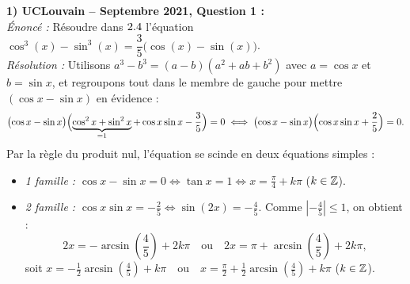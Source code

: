 \begin{exemple}
\textbf{1) UCLouvain -- Septembre 2021, Question 1 :}\\
\emph{Énoncé :} Résoudre dans $2.4$ l'équation $\cos^3(x) - \sin^3(x) = \dfrac{3}{5}\bigl(\cos(x) - \sin(x)\bigr)$.\\
\emph{Résolution :} Utilisons $a^3 - b^3 = (a-b)(a^2 + ab + b^2)$ avec $a = \cos x$ et $b = \sin x$, et regroupons tout dans le membre de gauche pour mettre $(\cos x - \sin x)$ en évidence :
\[
    \bigl(\cos x - \sin x\bigr)\Bigl(\underbrace{\cos^2 x + \sin^2 x}_{=1} + \cos x \sin x - \frac{3}{5}\Bigr) = 0 \iff \bigl(\cos x - \sin x\bigr)\Bigl(\cos x \sin x + \frac{2}{5}\Bigr) = 0.
\]
Par la règle du produit nul, l'équation se scinde en deux équations simples :
\begin{itemize}
    \item \emph{1 famille :} $\cos x - \sin x = 0 \iff \tan x = 1 \iff \boxed{x = \frac{\pi}{4} + k\pi}$ ($k \in \mathbb{Z}$).
    \item \emph{2 famille :} $\cos x \sin x = -\frac{2}{5} \iff \sin(2x) = -\frac{4}{5}$. Comme $\left|-\frac{4}{5}\right| \le 1$, on obtient :
    \[
        2x = -\arcsin\left(\frac{4}{5}\right) + 2k\pi \quad \text{ou} \quad 2x = \pi + \arcsin\left(\frac{4}{5}\right) + 2k\pi,
    \]
    soit $\boxed{x = -\frac{1}{2}\arcsin\left(\frac{4}{5}\right) + k\pi \quad \text{ou} \quad x = \frac{\pi}{2} + \frac{1}{2}\arcsin\left(\frac{4}{5}\right) + k\pi}$ ($k \in \mathbb{Z}$).
\end{itemize}


\end{exemple}
